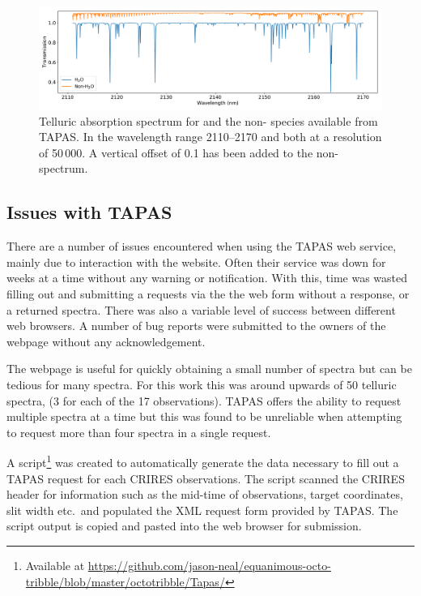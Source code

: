\begin{figure}
    \centering
    \includegraphics[width=0.9\linewidth]{figures/atmos_and_models/telluric_components}
    \caption[Telluric spectra for the  and non- species.]{Telluric absorption spectrum for  and the non- species available from {TAPAS}.
        In the wavelength range 2110--2170\nm{} and both at a resolution of 50\,000.
        A vertical offset of 0.1 has been added to the non- spectrum.}
    \label{fig:telluriccomponents}
\end{figure}


\subsection{Issues with {TAPAS}}
There are a number of issues encountered when using the {TAPAS} web service, mainly due to interaction with the website.
Often their service was down for weeks at a time without any warning or notification.
With this, time was wasted filling out and submitting a requests via the the web form without a response, or a returned spectra.
There was also a variable level of success between different web browsers.
A number of bug reports were submitted to the owners of the webpage without any acknowledgement.

The webpage is useful for quickly obtaining a small number of spectra but can be tedious for many spectra.
For this work this was around upwards of 50 telluric spectra, (3 for each of the 17 observations).
{TAPAS} offers the ability to request multiple spectra at a time but this was found to be unreliable when attempting to request more than four spectra in a single request.

A script\footnote{Available at \href{https://github.com/jason-neal/equanimous-octo-tribble/blob/master/octotribble/Tapas/}{https://github.com/jason-neal/equanimous-octo-tribble/blob/master/octotribble/Tapas/}} was created to automatically generate the data necessary to fill out a {TAPAS} request for each {CRIRES} observations.
The script scanned the {CRIRES} header for information such as the mid-time of observations, target coordinates, slit width etc.\ and populated the {XML} request form provided by {TAPAS}.
The script output is copied and pasted into the web browser for submission.

